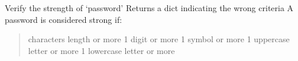 \documentclass[letterpaper,10pt,english]{sphinxmanual}
\begin{document}
\begin{fulllineitems}

\begin{fulllineitems}
\label{\detokenize{CE_app.auth:CE_app.auth.forms.ResetPasswordForm.validate_password}}
\sphinxAtStartPar
Verify the strength of ‘password’
Returns a dict indicating the wrong criteria
A password is considered strong if:
\begin{quote}

 characters length or more
1 digit or more
1 symbol or more
1 uppercase letter or more
1 lowercase letter or more
\end{quote}

\end{fulllineitems}


\end{fulllineitems}

\end{document}

